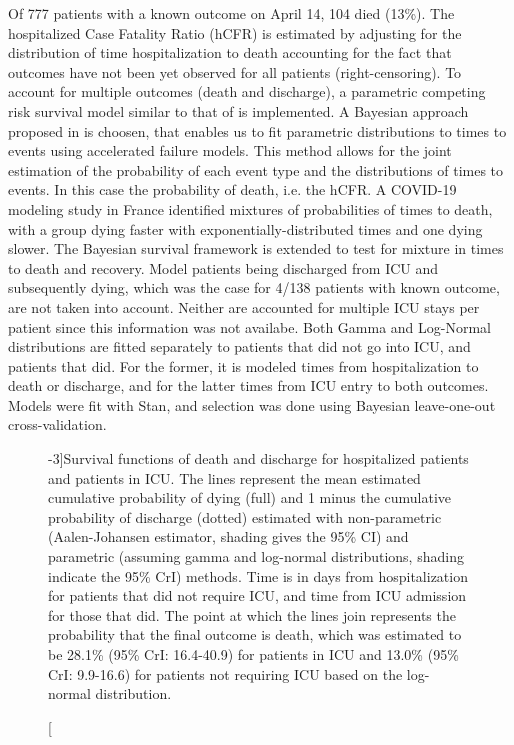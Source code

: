 {Of 777 patients with a known outcome on April 14, 104 died (13\%). 
The hospitalized Case Fatality Ratio (hCFR) is estimated by adjusting for the distribution of time hospitalization to death accounting for the fact that outcomes have not been yet observed for all patients (right-censoring). To account for multiple outcomes (death and discharge), a parametric competing risk survival model similar to that of\cite{Ghani:MethodsEstimatingCase:2005} is implemented. A Bayesian approach proposed in\cite{Bellot:TreebasedBayesianMixture:2018} is choosen, that enables us to fit parametric distributions to times to events using accelerated failure models. This method allows for the joint estimation of the probability of each event type and the distributions of times to events. In this case the probability of death, i.e. the hCFR. A COVID-19 modeling study in France identified mixtures of probabilities of times to death, with a group dying faster with exponentially-distributed times and one dying slower\cite{Salje:EstimatingBurdenSARSCoV2:2020}. The Bayesian survival framework is extended to test for mixture in times to death and recovery. Model patients being discharged from ICU and subsequently dying, which was the case for 4/138 patients with known outcome, are not taken into account. Neither are accounted for multiple ICU stays per patient since this information was not availabe. Both Gamma and Log-Normal distributions are fitted separately to patients that did not go into ICU, and patients that did. For the former, it is modeled times from hospitalization to death or discharge, and for the latter times from ICU entry to both outcomes. Models were fit with Stan\cite{Carpenter:StanProbabilisticProgramming:2017}, and selection was done using Bayesian leave-one-out cross-validation\cite{Vehtari:PracticalBayesianModel:2017}. \\
\begin{figure}[!htb]
    \centering
        \caption[Survival functions of death and discharge for hospitalized patients and patients in ICU][-3\baselineskip]{Survival functions of death and discharge for hospitalized patients and patients in ICU. The lines represent the mean estimated cumulative probability of dying (full) and 1 minus the cumulative probability of discharge (dotted) estimated with non-parametric (Aalen-Johansen estimator, shading gives the 95\% CI) and parametric (assuming gamma and log-normal distributions, shading indicate the 95\% CrI) methods. Time is in days from hospitalization for patients that did not require ICU, and time from ICU admission for those that did. The point at which the lines join represents the probability that the final outcome is death, which was estimated to be 28.1\% (95\% CrI: 16.4-40.9) for patients in ICU and 13.0\% (95\% CrI: 9.9-16.6) for patients not requiring ICU based on the log-normal distribution.}

\end{figure}}
